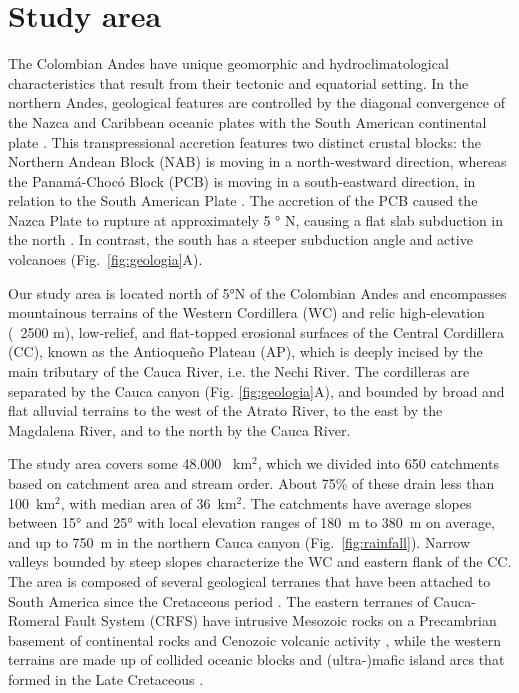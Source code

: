 \documentclass[draft]{agujournal2019}
\begin{document}
\section{Study area}
\par The Colombian Andes have unique geomorphic and hydroclimatological characteristics that result from their tectonic and equatorial setting. In the northern Andes, geological features are controlled by the diagonal convergence of the Nazca and Caribbean oceanic plates with the South American continental plate \cite{Cediel2003, acosta2007, trenkamp2002}. This transpressional accretion features two distinct crustal blocks: the Northern Andean Block (NAB) is moving in a north-westward direction, whereas the Panamá-Chocó Block (PCB) is moving in a south-eastward direction, in relation to the South American Plate \cite{kellogg1995}. The accretion of the PCB caused the Nazca Plate to rupture at approximately 5 ° N, causing a flat slab subduction in the north \cite{Taboada2000}. In contrast, the south has a steeper subduction angle and active volcanoes \cite{perez2021, restrepo2019, farris2011, Taboada2000, mann1990} (Fig.~\ref{fig:geologia}A). 

\par Our study area is located north of 5°N of the Colombian Andes and encompasses mountainous terrains of the Western Cordillera (WC) and relic high-elevation (~2500 m), low-relief, and flat-topped erosional surfaces of the Central Cordillera (CC), known as the Antioqueño Plateau (AP), which is deeply incised by the main tributary of the Cauca River, i.e. the Nechi River. The cordilleras are separated by the Cauca canyon (Fig. \ref{fig:geologia}A), and bounded by broad and flat alluvial terrains to the west of the Atrato River, to the east by the Magdalena River, and to the north by the Cauca River. 

\par The study area covers some 48.000~ km$^2$, which we divided into 650 catchments based on catchment area and stream order. About 75\% of these drain less than 100~km$^{2}$, with median area of 36~km$^{2}$. The catchments have average slopes between 15° and 25° with local elevation ranges of 180~m to 380~m on average, and up to 750~m in the northern Cauca canyon (Fig.~\ref{fig:rainfall}). Narrow valleys bounded by steep slopes characterize the WC and eastern flank of the CC. The area is composed of several geological terranes that have been attached to South America since the Cretaceous period \cite{Cediel2003}. The eastern terranes of Cauca-Romeral Fault System (CRFS) have intrusive Mesozoic rocks on a Precambrian basement of continental rocks and Cenozoic volcanic activity \cite{Cediel2003}, while the western terrains are made up of collided oceanic blocks and (ultra-)mafic island arcs that formed in the Late Cretaceous \cite{cardona2012arc}.
\end{document}
